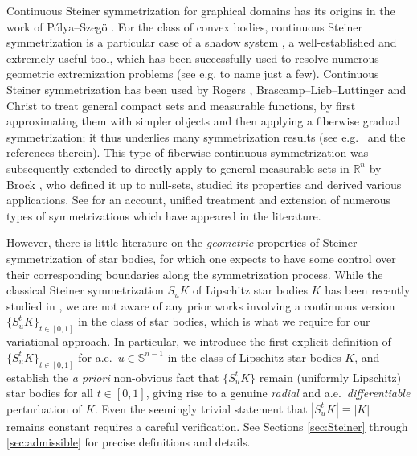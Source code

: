 \documentclass[11pt]{article}
\theoremstyle{definition}
\theoremstyle{proof}
\DeclareMathOperator{\+}{\mathop{\tilde{+}}}
\newcommand{\R}{\mathbb{R}}
\renewcommand{\S}{\mathbb{S}}
\numberwithin{equation}{section}
\numberwithin{equation}{section}
\begin{document}
Continuous Steiner symmetrization for graphical domains has its origins in the work of P\'olya--Szeg\"o \cite[Note B]{PolyaSzego-Book}.
For the class of convex bodies, continuous Steiner symmetrization is a particular case of a shadow system \cite{RogersShephard-ShadowSystems,Shephard-ShadowSystems}, a well-established and extremely useful tool, which has been successfully used to resolve numerous geometric extremization problems (see e.g. \cite{CampiGronchi-LpBusemannPettyCentroid,   CampiGronchi-VolumeProductInqs, CFPP-EasyBusemannAndCampiGronchi,  MeyerReisner-SantaloViaShadowSystems,EMilmanYehudayoff-AffineQuermassintegrals, RogersShephard-ShadowSystems,  Saroglou-GeneralizedBCD, Shephard-ShadowSystems} to name just a few). Continuous Steiner symmetrization has been used by Rogers \cite{Rogers-BLL}, Brascamp--Lieb--Luttinger \cite{BrascampLiebLuttinger} and Christ \cite{Christ-KPlaneTransform} to treat general compact sets and measurable functions, by first approximating them with simpler objects and then applying a fiberwise gradual symmetrization; it thus underlies many symmetrization results (see e.g.~\cite{PaourisPivovarov-Survey} and the references therein). This type of fiberwise continuous symmetrization was subsequently extended to directly apply to general measurable sets in $\R^n$ by Brock \cite{Brock-ContSteiner,Brock-ContSteiner2}, who defined it up to null-sets, studied its properties and derived various applications. See \cite{BGGK-PolyaSzego} for an account, unified treatment and extension of numerous types of symmetrizations which have appeared in the literature. 

\smallskip

However, there is little literature on the \emph{geometric} properties of Steiner symmetrization of star bodies, for which one expects to have some control over their corresponding boundaries along the symmetrization process. While the classical Steiner symmetrization $S_u K$ of Lipschitz star bodies $K$ has been recently studied in \cite{LinXi-LipschitzStarBodySymmetrization}, we are not aware of any prior works involving a continuous version $\{S_u^t K\}_{t \in [0,1]}$ in the class of star bodies, which is what we require for our variational approach. In particular, we introduce the first explicit definition of $\{S_u^t K\}_{t \in [0,1]}$ for a.e.~$u \in \S^{n-1}$ in the class of Lipschitz star bodies $K$, and establish the {\it a priori} non-obvious fact that $\{S_u^t K\}$ remain (uniformly Lipschitz) star bodies for all $t \in [0,1]$, giving rise to a genuine \emph{radial} and a.e.~\emph{differentiable} perturbation of $K$. Even the seemingly trivial statement that $|S_u^t K|\equiv |K|$ remains constant requires a careful verification. See Sections \ref{sec:Steiner} through \ref{sec:admissible} for precise definitions and details. 
\end{document}
